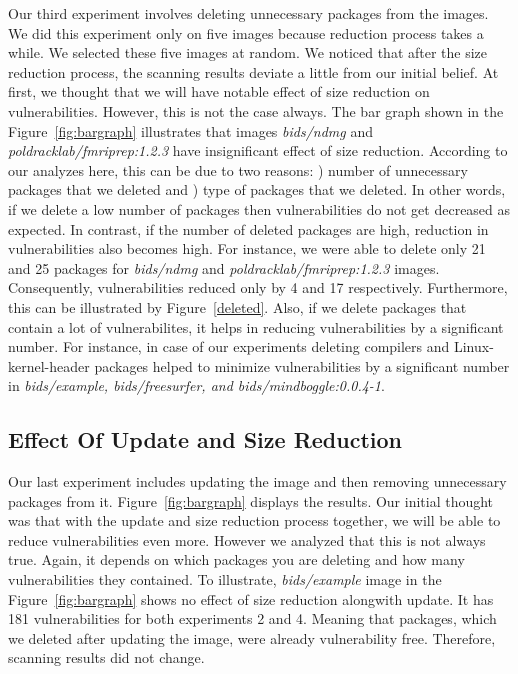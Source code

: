 \documentclass[a4paper,num-refs]{oup-contemporary}
\newcommand{\rom}[1]{\lowercase\expandafter{\romannumeral #1\relax}}
\begin{document}
Our third experiment involves deleting unnecessary packages from the images.
We did this experiment only on five images because reduction process takes a
while. We selected these five images at random. We noticed that
after the size reduction process, the scanning results deviate a little from our initial belief.
At first, we thought that we will have notable effect of size reduction on
vulnerabilities. However, this is not the case always. The bar graph shown in
the Figure~\ref{fig:bargraph} illustrates that images \textit{bids/ndmg} and
\textit{poldracklab/fmriprep:1.2.3} have insignificant effect of size reduction.
According to our analyzes here, this can be due to two reasons: \rom{1}) number
of unnecessary packages that we deleted and \rom{2}) type of packages that we deleted. In other
words, if we delete a low number of packages then vulnerabilities do not get decreased as expected.
In contrast, if the number of deleted packages are high, reduction
in vulnerabilities also becomes high. For instance, we were able to delete only 21 and 25 packages for 
\textit{bids/ndmg} and \textit{poldracklab/fmriprep:1.2.3} images. Consequently, vulnerabilities
reduced only by 4 and 17 respectively. Furthermore, this can be illustrated by Figure~\ref{deleted}.
Also, if we delete packages that contain a lot of vulnerabilites, it helps in reducing
vulnerabilities by a significant number. For instance, in case of our experiments
deleting compilers and Linux-kernel-header packages helped to minimize vulnerabilities
by a significant number in \textit{bids/example, bids/freesurfer, and bids/mindboggle:0.0.4-1}. 

\subsection{Effect Of Update and Size Reduction}

Our last experiment includes updating the image and then removing unnecessary packages from it.
Figure~\ref{fig:bargraph} displays the results. 
Our initial thought was that with the update and size reduction process together, we will be able to
reduce vulnerabilities even more. However
we analyzed that this is not always true. Again, it depends on which packages you are deleting and how
many vulnerabilities they contained. To illustrate, \textit{bids/example} image in the Figure~\ref{fig:bargraph}
shows no effect of size reduction alongwith update. It has 181 vulnerabilities for both experiments 2 and 4.
Meaning that packages, which we deleted after updating the image, were already vulnerability free. Therefore,
scanning results did not change.
\end{document}
